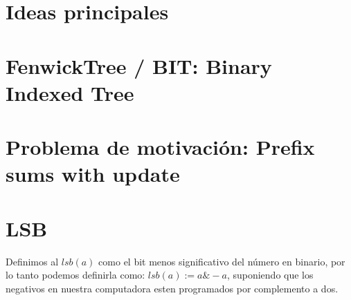 \documentclass[12pt, fleqn]{report}                             %
\theoremstyle{break}                                            %
\begin{document}
        \section{Ideas principales}

            
                

    \clearpage
    \section{FenwickTree / BIT: Binary Indexed Tree}

        \section{Problema de motivación: Prefix sums with update}


        \section{LSB}

            Definimos al $lsb(a)$ como el bit menos significativo del número en binario,
            por lo tanto podemos definirla como:  $lsb(a) := a \& -a$, suponiendo que 
            los negativos en nuestra computadora esten programados por complemento a dos.
            
            

            

            


\end{document}
